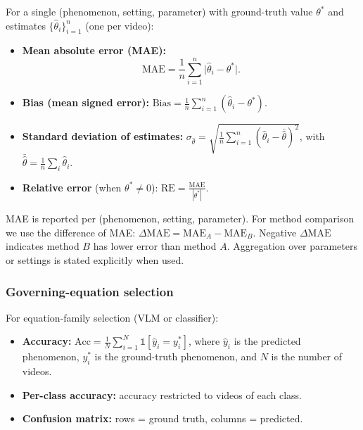 For a single (phenomenon, setting, parameter) with ground-truth value $\theta^*$ and estimates $\{\hat{\theta}_i\}_{i=1}^n$ (one per video):

\begin{itemize}[noitemsep]
  \item \textbf{Mean absolute error (MAE):}
  \begin{equation}
    \mathrm{MAE} = \frac{1}{n} \sum_{i=1}^{n} \bigl| \hat{\theta}_i - \theta^* \bigr|.
  \end{equation}
  \item \textbf{Bias (mean signed error):}
  $\displaystyle \mathrm{Bias} = \frac{1}{n} \sum_{i=1}^{n} (\hat{\theta}_i - \theta^*)$.
  \item \textbf{Standard deviation of estimates:}
  $\displaystyle \sigma_{\hat{\theta}} = \sqrt{\frac{1}{n}\sum_{i=1}^{n} (\hat{\theta}_i - \bar{\hat{\theta}})^2}$, with $\bar{\hat{\theta}} = \frac{1}{n}\sum_i \hat{\theta}_i$.
  \item \textbf{Relative error} (when $\theta^* \neq 0$):
  $\displaystyle \mathrm{RE} = \frac{\mathrm{MAE}}{|\theta^*|}$.
\end{itemize}

MAE is reported per (phenomenon, setting, parameter). For method comparison we use the difference of MAE: $\Delta\mathrm{MAE} = \mathrm{MAE}_A - \mathrm{MAE}_B$. Negative $\Delta\mathrm{MAE}$ indicates method $B$ has lower error than method $A$. Aggregation over parameters or settings is stated explicitly when used.

\subsubsection{Governing-equation selection}
\label{sec:metrics_eq}

For equation-family selection (VLM or classifier):

\begin{itemize}[noitemsep]
  \item \textbf{Accuracy:}
  $\displaystyle \mathrm{Acc} = \frac{1}{N} \sum_{i=1}^{N} \mathbb{1}[\hat{y}_i = y_i^*]$, where $\hat{y}_i$ is the predicted phenomenon, $y_i^*$ is the ground-truth phenomenon, and $N$ is the number of videos.
  \item \textbf{Per-class accuracy:} accuracy restricted to videos of each class.
  \item \textbf{Confusion matrix:} rows = ground truth, columns = predicted.
\end{itemize}

